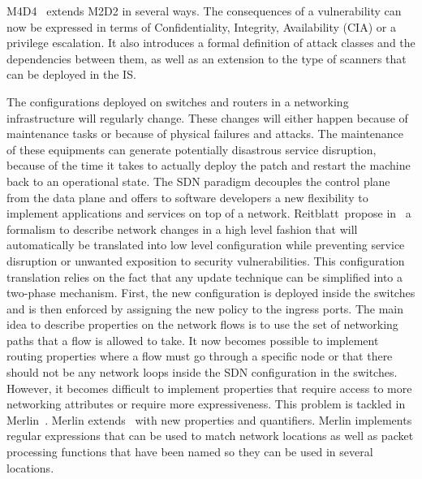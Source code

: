 M4D4~\cite{M4D4-Morin2008} extends M2D2 in several ways. The consequences of a vulnerability can now be expressed in terms of Confidentiality, Integrity, Availability (CIA) or a privilege escalation.
It also introduces a formal definition of attack classes and the dependencies between them, as well as an extension to the type of scanners that can be deployed in the IS.

The configurations deployed on switches and routers in a networking infrastructure will regularly change. These changes will either happen because of maintenance tasks or because of physical failures and attacks.
The maintenance of these equipments can generate potentially disastrous service disruption, because of the time it takes to actually deploy the patch and restart the machine back to an operational state.
The SDN paradigm decouples the control plane from the data plane and offers to software developers a new flexibility to implement applications and services on top of a network.
Reitblatt~\etal propose in~\cite{abstraction-reitblatt2012} a formalism to describe network changes in a high level fashion that will automatically be translated into low level configuration while preventing service disruption or unwanted exposition to security vulnerabilities.
This configuration translation relies on the fact that any update technique can be simplified into a two-phase mechanism. First, the new configuration is deployed inside the switches and is then enforced by assigning the new policy to the ingress ports.
The main idea to describe properties on the network flows is to use the set of networking paths that a flow is allowed to take.
It now becomes possible to implement routing properties where a flow must go through a specific node or that there should not be any network loops inside the SDN configuration in the switches.
However, it becomes difficult to implement properties that require access to more networking attributes or require more expressiveness. This problem is tackled in Merlin~\cite{Merlin-Soule2013}.
Merlin extends~\cite{abstraction-reitblatt2012} with new properties and quantifiers.
Merlin implements regular expressions that can be used to match network locations as well as packet processing functions that have been named so they can be used in several locations.

